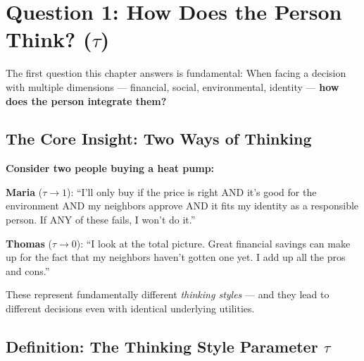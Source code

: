 
\section{Question 1: How Does the Person Think? ($\tau$)}
\label{sec:12-thinking-style}

The first question this chapter answers is fundamental: When facing a decision 
with multiple dimensions — financial, social, environmental, identity — 
\textbf{how does the person integrate them?}

\subsection{The Core Insight: Two Ways of Thinking}
\label{subsec:12-2-core-insight}

\begin{intuition}
\textbf{Consider two people buying a heat pump:}

\textbf{Maria} ($\tau \to 1$): ``I'll only buy if the price is right AND 
it's good for the environment AND my neighbors approve AND it fits my identity 
as a responsible person. If ANY of these fails, I won't do it.''

\textbf{Thomas} ($\tau \to 0$): ``I look at the total picture. Great financial 
savings can make up for the fact that my neighbors haven't gotten one yet. 
I add up all the pros and cons.''

These represent fundamentally different \textit{thinking styles} — and they 
lead to different decisions even with identical underlying utilities.
\end{intuition}

\subsection{Definition: The Thinking Style Parameter $\tau$}
\label{subsec:12-2-definition}

